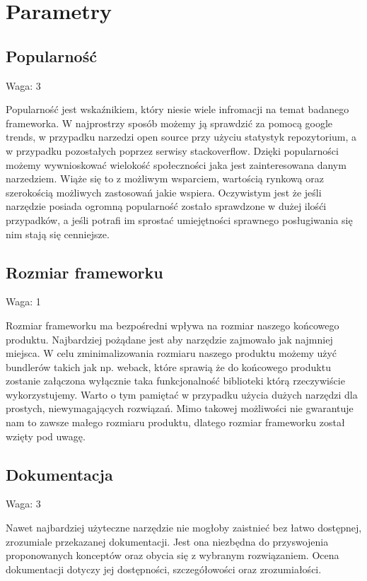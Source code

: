 \documentclass[12pt]{report}
\begin{document}
  \section{Parametry}
    \subsection{Popularność}
      \begin{description}
        \item Waga: 3
      \end{description}
      Popularność jest wskaźnikiem, który niesie wiele infromacji na temat badanego frameworka.
      W najprostrzy sposób możemy ją sprawdzić za pomocą google trends, w przypadku narzedzi open source przy użyciu statystyk repozytorium, a w przypadku pozostałych poprzez serwisy stackoverflow.
      Dzięki popularności możemy wywnioskować wielokość społeczności jaka jest zainteresowana danym narzedziem.
      Wiąże się to z możliwym wsparciem, wartością rynkową oraz szerokością możliwych zastosowań jakie wspiera.
      Oczywistym jest że jeśli narzędzie posiada ogromną popularność zostało sprawdzone w dużej ilośći przypadków, a jeśli potrafi im sprostać umiejętności sprawnego posługiwania się nim stają się cenniejsze.

    \subsection{Rozmiar frameworku}
      \begin{description}
        \item Waga: 1
      \end{description}
      Rozmiar frameworku ma bezpośredni wpływa na rozmiar naszego końcowego produktu.
      Najbardziej pożądane jest aby narzędzie zajmowało jak najmniej miejsca.
      W celu zminimalizowania rozmiaru naszego produktu możemy użyć bundlerów takich jak np. weback, które sprawią że do końcowego produktu zostanie załączona wyłącznie taka funkcjonalność biblioteki którą rzeczywiście wykorzystujemy.
      Warto o tym pamiętać w przypadku użycia dużych narzędzi dla prostych, niewymagających rozwiązań.
      Mimo takowej możliwości nie gwarantuje nam to zawsze małego rozmiaru produktu, dlatego rozmiar frameworku został wzięty pod uwagę.

    \subsection{Dokumentacja}
      \begin{description}
        \item Waga: 3
      \end{description}
      Nawet najbardziej użyteczne narzędzie nie mogłoby zaistnieć bez łatwo dostępnej, zrozumiale przekazanej dokumentacji.
      Jest ona niezbędna do przyswojenia proponowanych konceptów oraz obycia się z wybranym rozwiązaniem.
      Ocena dokumentacji dotyczy jej dostępności, szczegółowości oraz zrozumiałości.
\end{document}
